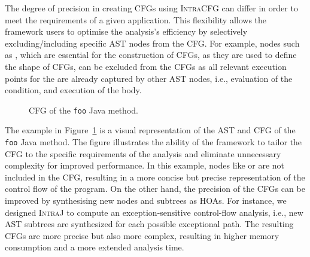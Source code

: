 The degree of precision in creating CFGs using \textsc{IntraCFG} can differ in order
to meet the requirements of a given application.
This flexibility allows the framework users to optimise the analysis's efficiency
by selectively excluding/including specific AST nodes from the CFG.
For example, nodes such as , which are essential for the
construction of CFGs, as they are used to define the shape of CFGs, can be excluded
from the CFGs as all relevant execution points for the  are
already captured by other AST nodes, i.e., evaluation of the condition, and execution
of the body.
\begin{figure}[H]
	\centering
	\caption{\label{fig:CFG} CFG of the \texttt{foo} Java method.}
\end{figure}

The example in Figure~\ref{fig:CFG} is a visual representation of the AST and CFG of the
\texttt{foo} Java method. The figure illustrates the ability of the framework to tailor the CFG
to the specific requirements of the analysis and eliminate unnecessary complexity for improved performance.
In this example, nodes like  or  are not included in the CFG,
resulting in a more concise but precise representation of the control flow of the program.
On the other hand, the precision of the CFGs can be improved by synthesising new nodes and subtrees as HOAs.
For instance, we designed \textsc{IntraJ} to compute an exception-sensitive
control-flow analysis, i.e., new AST subtrees are synthesized for each possible exceptional path.
The resulting CFGs are more precise but also more complex, resulting
in higher memory consumption and a more extended analysis time.



